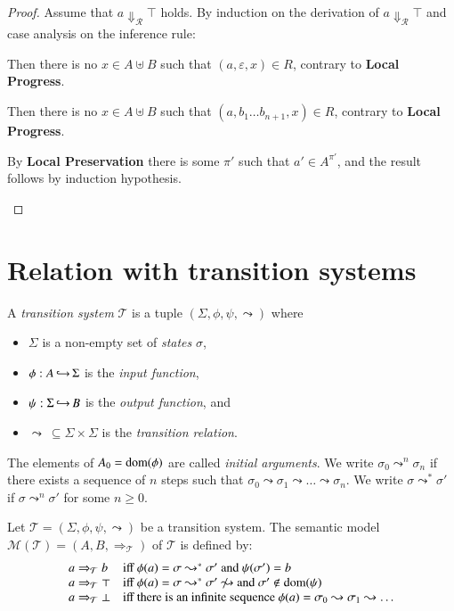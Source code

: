 \documentclass[a4paper,final,preprint,sort&compress]{elsarticle}
\newcommand{\M}{\ensuremath{\mathcal{M}}}
\newcommand{\R}{\ensuremath{\mathcal{R}}}
\newcommand{\T}{\ensuremath{\mathcal{T}}}
\begin{document}
\begin{proof}
  Assume that $a \Downarrow_\R \top$ holds. By induction on the derivation of $a \Downarrow_\R \top$ and
  case analysis on the inference rule:
  \begin{description}[font=\sc,labelindent=\parindent,style=nextline]
  \item[(Err-1)]

    Then there is no \mbox{$x \in A \uplus B$} such that \mbox{$(a,\varepsilon,x) \in R$},
    contrary to \textbf{Local Progress}.

  \item[(Err-2)]

    Then there is no \mbox{$x \in A \uplus B$} such that \mbox{$(a,b_1 \ldots b_{n+1},x) \in R$},
    contrary to \textbf{Local Progress}.

  \item[(Err-3)]

    By \textbf{Local Preservation} there is some $\pi'$ such that $a' \in A^{\pi'}$, and the result
    follows by induction hypothesis.
    
  \end{description}
\end{proof}


\section{Relation with transition systems}
\label{sec:Relation_with_transition_systems}


A \emph{transition system} $\T$ is a tuple $(\Sigma, \phi, \psi, \leadsto)$ where
\begin{itemize}
\item $\Sigma$ is a non-empty set of \emph{states} $\sigma$,
\item $\phi: A \operatorname{\hookrightarrow} \Sigma$ is the \emph{input function},
\item $\psi: \Sigma \operatorname{\hookrightarrow} B$ is the \emph{output function}, and
\item $\leadsto~\subseteq \Sigma \times \Sigma$ is the \emph{transition relation}.
\end{itemize}
The elements of $A_0 = \operatorname{dom}(\phi)$ are called \emph{initial arguments}.
We write \mbox{$\sigma_0 \leadsto^n \sigma_n$} if there exists a sequence of $n$ steps
such that \mbox{$\sigma_0 \leadsto \sigma_1 \leadsto \ldots \leadsto \sigma_n$}. We
write \mbox{$\sigma \leadsto^* \sigma'$} if \mbox{$\sigma \leadsto^n \sigma'$} for some
\mbox{$n \ge 0$}.

Let $\T = (\Sigma,\phi,\psi,\leadsto)$ be a transition system. The semantic model
\mbox{$\M(\T) = (A,B,\Rightarrow_\T)$} of $\T$ is defined by:
\[\begin{array}{ll}
  a \Rightarrow_\T b
  & \mbox{iff $\phi(a) = \sigma \leadsto^* \sigma'$ and $\psi(\sigma') = b$} \\
  a \Rightarrow_\T \top
  & \mbox{iff $\phi(a) = \sigma \leadsto^* \sigma' \not\leadsto$ and $\sigma' \not\in\dom(\psi)$} \\
  a \Rightarrow_\T \bot
  & \mbox{iff there is an infinite sequence $\phi(a) = \sigma_0 \leadsto \sigma_1 \leadsto \ldots$} \\
\end{array}\]
\end{document}
